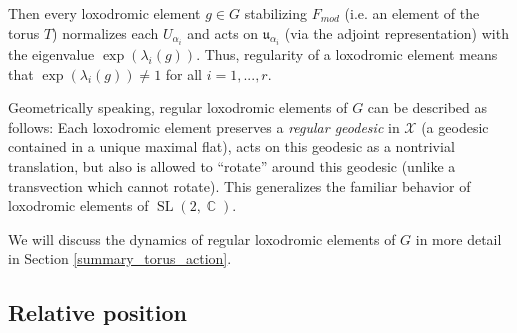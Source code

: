 \documentclass[12pt]{amsbook}%
\theoremstyle{definition}
\theoremstyle{remark}
\numberwithin{section}{chapter}
\numberwithin{subsection}{section}
\numberwithin{figure}{chapter}
\DeclareMathOperator{\C}{\mathbb{C}}
\DeclareMathOperator{\SL}{SL}
\def\Fmod{F_{mod}}
\def\cF{{\mathscr{F}}}
\def\cX{{\mathscr{X}}}
\def\la{\lambda}
\begin{document}
{{%
Then every loxodromic element $g\in G$ stabilizing $\Fmod$ (i.e. an element of the torus $T$) 
normalizes each  $U_{\alpha_i}$ and acts on ${\mathfrak u}_{\alpha_i}$ 
(via the adjoint representation) with the eigenvalue $\exp(\la_i(g))$.  Thus, regularity of a loxodromic element means that 
$\exp(\la_i(g))\ne 1$ for all $i=1,...,r$. 

Geometrically speaking, regular loxodromic elements of $G$ can be described as follows: Each loxodromic element preserves a {\em regular geodesic} in $\cX$ (a geodesic contained in a unique maximal flat), acts on this geodesic as a nontrivial translation, but also is allowed to ``rotate'' around this geodesic (unlike a transvection which cannot rotate). This generalizes the familiar behavior of loxodromic elements of $\SL(2,\C)$. 


We will discuss the dynamics of regular loxodromic elements of $G$ in more detail in Section \ref{summary_torus_action}. 

 
  
 


\subsection{Relative position} \label{section_relative_position_bruhat}




}}
\end{document}
